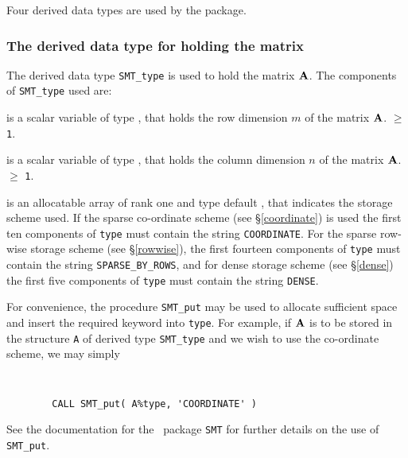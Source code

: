 \documentclass{galahad}
\begin{document}




\galtypes
Four derived data types are used by the package.


\subsubsection{The derived data type for holding the matrix}\label{typeprob}
The derived data type {\tt SMT\_type} is used to hold the matrix ${\mathbf{A}}$.
The components of {\tt SMT\_type} used are:

\begin{description}

 is a scalar variable of type \integer, that holds
the row dimension $m$ of the matrix  ${\mathbf{A}}$.
 $\geq$ {\tt 1}.

 is a scalar variable of type \integer, that holds
the column dimension $n$ of the matrix  ${\mathbf{A}}$.
 $\geq$ {\tt 1}.

 is an allocatable array of rank one and type default \character, that
indicates the storage scheme used. If the
sparse co-ordinate scheme (see \S\ref{coordinate}) is used
the first ten components of {\tt type} must contain the
string {\tt COORDINATE}.
For the sparse row-wise storage scheme (see \S\ref{rowwise}),
the first fourteen components of {\tt type} must contain the
string {\tt SPARSE\_BY\_ROWS}, and
for dense storage scheme (see \S\ref{dense})
the first five components of {\tt type} must contain the
string {\tt DENSE}.

For convenience, the procedure {\tt SMT\_put}
may be used to allocate sufficient space and insert the required keyword
into {\tt type}.
For example, if ${\mathbf{A}}$ is to be stored in the structure {\tt A}
of derived type {\tt SMT\_type} and we wish to use
the co-ordinate scheme, we may simply
{\tt
\begin{verbatim}
        CALL SMT_put( A%type, 'COORDINATE' )
\end{verbatim}
}
\noindent
See the documentation for the \galahad\ package {\tt SMT}
for further details on the use of {\tt SMT\_put}.


\end{description}
\end{document}
